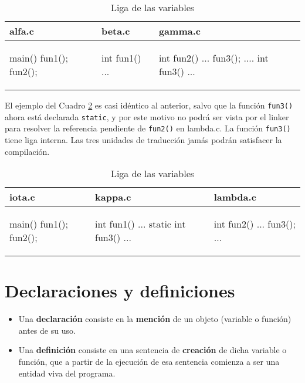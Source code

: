 \begin{ejemplo}
\begin{table}
\centering	
\begin{tabular}{l|l|l}
\hline
alfa.c & beta.c & gamma.c \\
\hline
\begin{codecell}
main()
{
	fun1();
	fun2();
}
\end{codecell}
&
\begin{codecell}
int fun1()
{
	...
}
\end{codecell}
&
\begin{codecell}
int fun2()
{
	...
	fun3();
	....
}
int fun3()
{
	...
}
\end{codecell}
\\
\end{tabular}
 \caption{Liga de las variables}
 \label{tab:ejliga} 
\end{table}
\end{ejemplo}


\begin{ejemplo}
El ejemplo del Cuadro \ref{tab:ejliga2} es casi idéntico al anterior, salvo que la función \lstinline{fun3()} ahora está declarada \lstinline{static}, y por este motivo no podrá ser vista por el linker para resolver la referencia pendiente de \lstinline{fun2()} en
lambda.c. La función \lstinline{fun3()} tiene liga interna. Las tres unidades de traducción jamás podrán satisfacer la compilación.

\begin{table}
\centering	
\begin{tabular}{l|l|l}
\hline
iota.c & kappa.c & lambda.c \\
\hline
\begin{codecell}
main()
{
	fun1();
	fun2();
}
\end{codecell}
&
\begin{codecell}
int fun1()
{
	...
}
static int fun3()
{
	...
}
\end{codecell}
&
\begin{codecell}
int fun2()
{
	...
	fun3();
	...
}
\end{codecell}
\\
\end{tabular}
 \caption{Liga de las variables}
 \label{tab:ejliga2} 
\end{table}
\end{ejemplo}


\section{Declaraciones y definiciones}
\begin{itemize}
	\item Una \textbf{declaración} consiste en la \textbf{mención} de un objeto (variable o función) antes de su uso.
	\item Una \textbf{definición} consiste en una sentencia de \textbf{creación} de dicha variable o función, que a partir de la ejecución de esa sentencia comienza a ser una entidad viva del programa.
\end{itemize}


